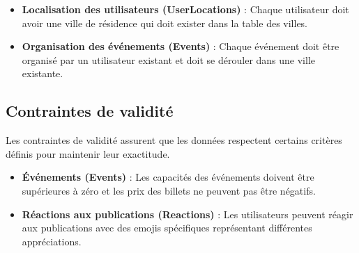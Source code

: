 \begin{itemize}
    \item \textbf{Localisation des utilisateurs (UserLocations)} : Chaque utilisateur doit avoir une ville de résidence qui doit exister dans la table des villes.
    \item \textbf{Organisation des événements (Events)} : Chaque événement doit être organisé par un utilisateur existant et doit se dérouler dans une ville existante.
\end{itemize}

\subsection*{Contraintes de validité}

Les contraintes de validité assurent que les données respectent certains critères définis pour maintenir leur exactitude.

\begin{itemize}
    \item \textbf{Événements (Events)} : Les capacités des événements doivent être supérieures à zéro et les prix des billets ne peuvent pas être négatifs.
    \item \textbf{Réactions aux publications (Reactions)} : Les utilisateurs peuvent réagir aux publications avec des emojis spécifiques représentant différentes appréciations.
\end{itemize}
